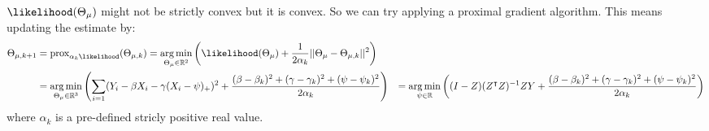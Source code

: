 \documentclass[12pt]{article}
\newcommand\Real{\mathbb{R}}
\newcommand\trans[1]{{#1}^\intercal}%
\DeclareMathOperator*{\argmin}{arg\,min}
\begin{document}
\(\likelihood(\Theta_\mu)\) might not be strictly convex but it is
convex. So we can try applying a proximal gradient algorithm. This
means updating the estimate by:
\begin{align*}
\Theta_{\mu,k+1} &= \text{prox}_{\alpha_k \likelihood}(\Theta_{\mu,k}) = \argmin_{\Theta_\mu \in \Real^2} \left( \likelihood(\Theta_\mu) + \frac{1}{2\alpha_k}||\Theta_\mu-\Theta_{\mu,k}||^2 \right) \\
&= \argmin_{\Theta_\mu \in \Real^3} \left( \sum_{i=1} (Y_i - \beta X_i - \gamma (X_i - \psi)_+)^2 + \frac{(\beta - \beta_k)^2+(\gamma - \gamma_k)^2+(\psi - \psi_k)^2}{2\alpha_k} \right) 
&= \argmin_{\psi \in \Real} \left((I - Z)(\trans{Z}Z)^{-1}ZY + \frac{(\beta - \beta_k)^2+(\gamma - \gamma_k)^2+(\psi - \psi_k)^2}{2\alpha_k}  \right)
\end{align*}
where \(\alpha_k\) is a pre-defined stricly positive real value.
\end{document}
